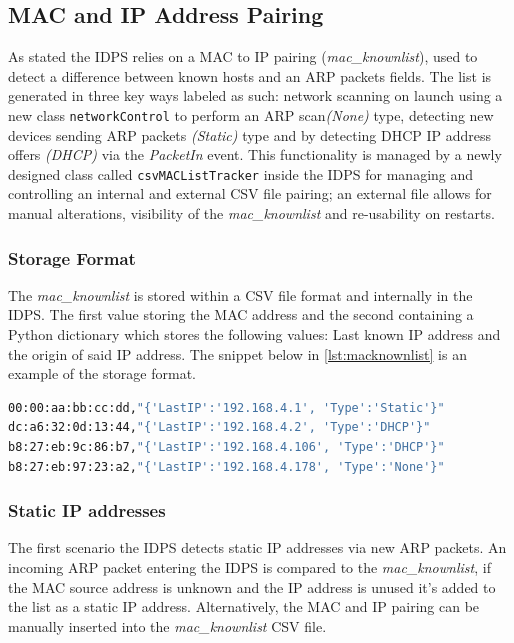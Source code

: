\documentclass[12pt, oneside]{book}
\begin{document}
\subsection{MAC and IP Address Pairing}
As stated the IDPS relies on a MAC to IP pairing (\emph{mac\_knownlist}), used to detect a difference between known hosts and an ARP packets
fields. The list is generated in three key ways labeled as such: network scanning on launch using a new 
class \lstinline{networkControl} to perform an ARP scan\emph{(None)} type,
detecting new devices sending ARP packets \emph{(Static)} type and by detecting DHCP IP address offers \emph{(DHCP)} via the \emph{PacketIn} event.
This functionality is managed by a newly designed class called \lstinline{csvMACListTracker} inside the IDPS for managing and controlling an internal and external
CSV file pairing; an external file allows for manual alterations, visibility of the \emph{mac\_knownlist} and re-usability on restarts.

\subsubsection{Storage Format}
The \emph{mac\_knownlist} is stored within a CSV file format and internally in the IDPS. The first value storing the
MAC address and the second containing
a Python dictionary which stores the following values: Last known IP address and the origin of said 
IP address.
The snippet below in \ref{lst:macknownlist} is an example of the storage format.

\begin{lstlisting}[language=Bash,caption={Known MAC list pairing format},captionpos=b,label={lst:macknownlist}]
00:00:aa:bb:cc:dd,"{'LastIP':'192.168.4.1', 'Type':'Static'}"
dc:a6:32:0d:13:44,"{'LastIP':'192.168.4.2', 'Type':'DHCP'}"
b8:27:eb:9c:86:b7,"{'LastIP':'192.168.4.106', 'Type':'DHCP'}"
b8:27:eb:97:23:a2,"{'LastIP':'192.168.4.178', 'Type':'None'}"
\end{lstlisting}

\subsubsection{Static IP addresses}
\label{subsubsec:staticIP}
The first scenario the IDPS detects static IP addresses via new ARP packets.
An incoming ARP packet entering the IDPS is compared to the \emph{mac\_knownlist}, if the MAC source address is unknown and the IP address
is unused it's added to the list as a static IP address. Alternatively, the MAC and IP pairing can be manually inserted
into the \emph{mac\_knownlist} CSV file.
\end{document}
